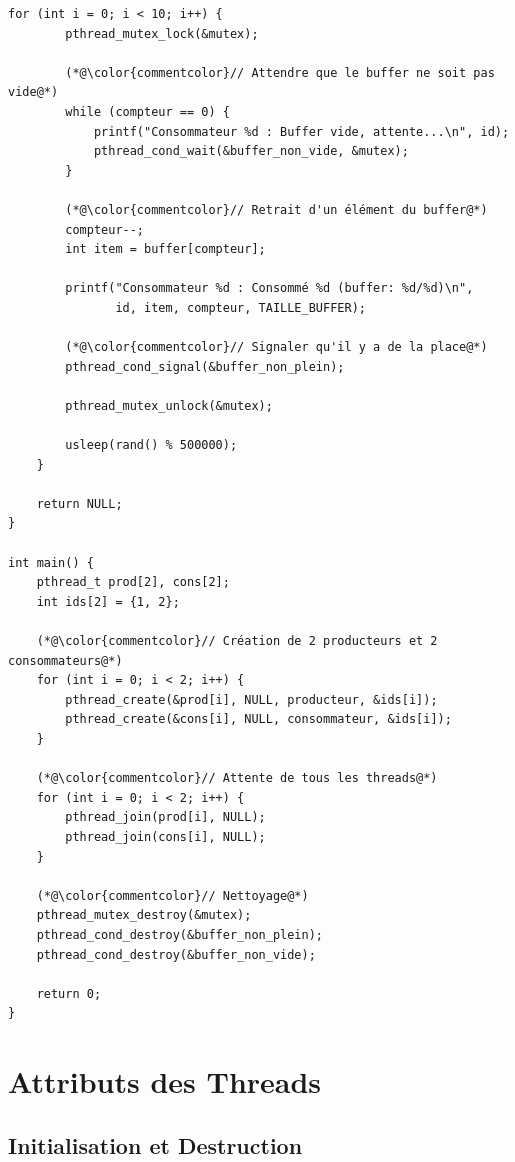 \documentclass[11pt,a4paper]{article}
\begin{document}
\begin{lstlisting}[caption={Problème classique producteur-consommateur}]
    for (int i = 0; i < 10; i++) {
        pthread_mutex_lock(&mutex);
        
        (*@\color{commentcolor}// Attendre que le buffer ne soit pas vide@*)
        while (compteur == 0) {
            printf("Consommateur %d : Buffer vide, attente...\n", id);
            pthread_cond_wait(&buffer_non_vide, &mutex);
        }
        
        (*@\color{commentcolor}// Retrait d'un élément du buffer@*)
        compteur--;
        int item = buffer[compteur];
        
        printf("Consommateur %d : Consommé %d (buffer: %d/%d)\n",
               id, item, compteur, TAILLE_BUFFER);
        
        (*@\color{commentcolor}// Signaler qu'il y a de la place@*)
        pthread_cond_signal(&buffer_non_plein);
        
        pthread_mutex_unlock(&mutex);
        
        usleep(rand() % 500000);
    }
    
    return NULL;
}

int main() {
    pthread_t prod[2], cons[2];
    int ids[2] = {1, 2};
    
    (*@\color{commentcolor}// Création de 2 producteurs et 2 consommateurs@*)
    for (int i = 0; i < 2; i++) {
        pthread_create(&prod[i], NULL, producteur, &ids[i]);
        pthread_create(&cons[i], NULL, consommateur, &ids[i]);
    }
    
    (*@\color{commentcolor}// Attente de tous les threads@*)
    for (int i = 0; i < 2; i++) {
        pthread_join(prod[i], NULL);
        pthread_join(cons[i], NULL);
    }
    
    (*@\color{commentcolor}// Nettoyage@*)
    pthread_mutex_destroy(&mutex);
    pthread_cond_destroy(&buffer_non_plein);
    pthread_cond_destroy(&buffer_non_vide);
    
    return 0;
}
\end{lstlisting}

\section{Attributs des Threads}

\subsection{Initialisation et Destruction}
\end{document}

